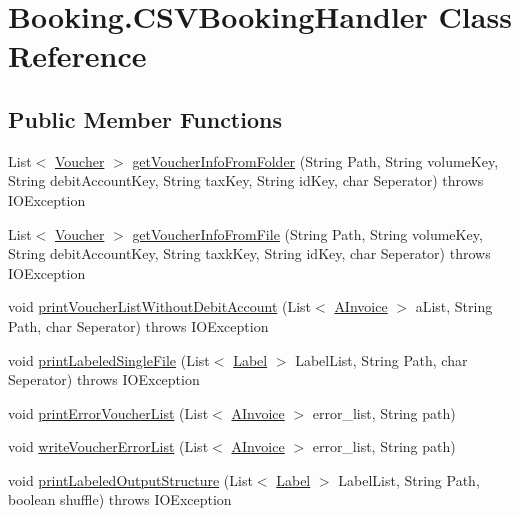 \hypertarget{class_booking_1_1_c_s_v_booking_handler}{}\section{Booking.\+C\+S\+V\+Booking\+Handler Class Reference}
\label{class_booking_1_1_c_s_v_booking_handler}
\subsection*{Public Member Functions}
\begin{DoxyCompactItemize}
\item 
List$<$ \hyperlink{class_booking_1_1_voucher}{Voucher} $>$ \hyperlink{class_booking_1_1_c_s_v_booking_handler_abb5b11ba019f5f4ec36cc05e080bdf4a}{get\+Voucher\+Info\+From\+Folder} (String Path, String volume\+Key, String debit\+Account\+Key, String tax\+Key, String id\+Key, char Seperator)  throws I\+O\+Exception
\item 
List$<$ \hyperlink{class_booking_1_1_voucher}{Voucher} $>$ \hyperlink{class_booking_1_1_c_s_v_booking_handler_ad9ffa72c3554080d3b2383805116ca29}{get\+Voucher\+Info\+From\+File} (String Path, String volume\+Key, String debit\+Account\+Key, String taxk\+Key, String id\+Key, char Seperator)  throws I\+O\+Exception
\item 
void \hyperlink{class_booking_1_1_c_s_v_booking_handler_a54cdf709488d718eea5b239033b0deaa}{print\+Voucher\+List\+Without\+Debit\+Account} (List$<$ \hyperlink{class_reduced_invoice_1_1_a_invoice}{A\+Invoice} $>$ a\+List, String Path, char Seperator)  throws I\+O\+Exception 	
\item 
void \hyperlink{class_booking_1_1_c_s_v_booking_handler_a3af1a9ce4819c6ea1f22a9010c803c72}{print\+Labeled\+Single\+File} (List$<$ \hyperlink{class_booking_1_1_label}{Label} $>$ Label\+List, String Path, char Seperator)  throws I\+O\+Exception
\item 
void \hyperlink{class_booking_1_1_c_s_v_booking_handler_ad5b394199d9f3ef0478393b7fa139d16}{print\+Error\+Voucher\+List} (List$<$ \hyperlink{class_reduced_invoice_1_1_a_invoice}{A\+Invoice} $>$ error\+\_\+list, String path)
\item 
void \hyperlink{class_booking_1_1_c_s_v_booking_handler_af00a4ebc544ce72dfddbda38218a12cb}{write\+Voucher\+Error\+List} (List$<$ \hyperlink{class_reduced_invoice_1_1_a_invoice}{A\+Invoice} $>$ error\+\_\+list, String path)
\item 
void \hyperlink{class_booking_1_1_c_s_v_booking_handler_af66a291077abb9531add6cbc94b0075a}{print\+Labeled\+Output\+Structure} (List$<$ \hyperlink{class_booking_1_1_label}{Label} $>$ Label\+List, String Path, boolean shuffle)  throws I\+O\+Exception

\end{DoxyCompactItemize}
